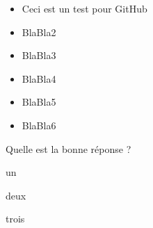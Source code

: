 \begin{acquis}
\begin{itemize}
\item Ceci est un test pour GitHub
\item BlaBla2
\item BlaBla3
\item BlaBla4
\item BlaBla5
\item BlaBla6
\end{itemize}
\end{acquis}


\begin{QCM}
  \begin{GroupeQCM} %
    \begin{exercice}
      Quelle est la bonne réponse ?
      \begin{ChoixQCM}{4}
      \item un
      \item deux
      \item trois
      \end{ChoixQCM}
\begin{corrige}
   \end{corrige}
    \end{exercice}


\end{GroupeQCM}
\end{QCM}

  